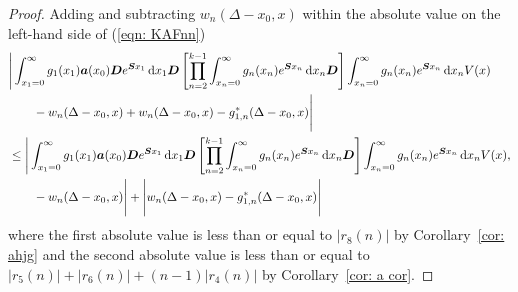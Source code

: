 \begin{proof}
	Adding and subtracting \(w_n(\Delta-x_0,x)\) within the absolute value on the left-hand side of (\ref{eqn: KAFnn}) 
	\begin{align*}
		&\Bigg| \int_{x_1=0}^\infty g_1(x_1) \boldsymbol a (x_0) \boldsymbol D e^{\boldsymbol{S}x_1}\, \mathrm{d} x_1\boldsymbol D 
            	\left[\prod_{n=2}^{k-1}\int_{x_n=0}^\infty g_n(x_n) e^{\boldsymbol{S}x_n} \, \mathrm{d} x_n
		\boldsymbol D\right]
            	\int_{x_n=0}^\infty g_{n}(x_n) e^{\boldsymbol{S}x_n} \, \mathrm{d} x_n V(x) \nonumber 
		\\\nonumber &{}\qquad - w_n(\Delta - x_0,x) + w_n(\Delta - x_0,x) - g_{1,n}^*(\Delta - x_0,x) \Bigg| 
		\\&\leq \Bigg| \int_{x_1=0}^\infty g_1(x_1) \boldsymbol a (x_0) \boldsymbol D e^{\boldsymbol{S}x_1}\, \mathrm{d} x_1\boldsymbol D 
            	\left[\prod_{n=2}^{k-1}\int_{x_n=0}^\infty g_n(x_n) e^{\boldsymbol{S}x_n} \, \mathrm{d} x_n
		\boldsymbol D\right]
            	\int_{x_n=0}^\infty g_{n}(x_n) e^{\boldsymbol{S}x_n} \, \mathrm{d} x_n V(x) ,\nonumber 
	\\&\qquad - w_n(\Delta - x_0,x)\Bigg| + \Bigg| w_n(\Delta - x_0,x) - g_{1,n}^*(\Delta - x_0,x) \Bigg| 
	\end{align*}
	where the first absolute value is less than or equal to \(|r_8(n)|\) by Corollary~\ref{cor: ahjg} and the second absolute value is less than or equal to \(|r_5(n)|+|r_6(n)| + (n-1)|r_4(n)|\) by Corollary~\ref{cor: a cor}.
\end{proof}

